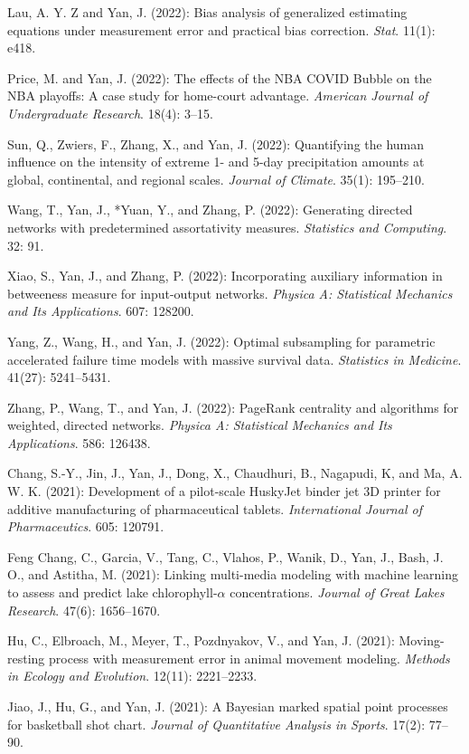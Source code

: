 \documentclass[Statistics]{vita}
\begin{document}
\begin{vita}
\begin{Publications}
\begin{RefereedJournalArticles}
  \item *Lau, A. Y. Z and Yan, J. (2022): Bias analysis of generalized estimating equations under measurement error and practical bias correction. {\em Stat\/}. 11(1): e418.
  \item *Price, M. and Yan, J. (2022): The effects of the NBA COVID Bubble on the NBA playoffs: A case study for home-court advantage. {\em American Journal of Undergraduate Research\/}. 18(4): 3--15.
  \item Sun, Q., Zwiers, F., Zhang, X., and Yan, J. (2022): Quantifying the human influence on the intensity of extreme 1- and 5-day precipitation amounts at global, continental, and regional scales. {\em Journal of Climate\/}. 35(1): 195--210.
  \item Wang, T., Yan, J., *Yuan, Y., and Zhang, P. (2022): Generating directed networks with predetermined assortativity measures. {\em Statistics and Computing}. 32: 91.
  \item *Xiao, S., Yan, J., and Zhang, P. (2022): Incorporating auxiliary information in betweeness measure for input-output networks. {\em Physica A: Statistical Mechanics and Its Applications\/}. 607: 128200.
  \item *Yang, Z., Wang, H., and Yan, J. (2022): Optimal subsampling for parametric accelerated failure time models with massive survival data. {\em Statistics in Medicine}. 41(27): 5241--5431.
  \item Zhang, P., Wang, T., and Yan, J. (2022): PageRank centrality and algorithms for weighted, directed networks. {\em Physica A: Statistical Mechanics and Its Applications\/}. 586: 126438.
  \item Chang, S.-Y., Jin, J., Yan, J., Dong, X., Chaudhuri, B., Nagapudi, K, and Ma, A. W. K. (2021): Development of a pilot-scale HuskyJet binder jet 3D printer for additive manufacturing of pharmaceutical tablets. {\em International Journal of Pharmaceutics\/}. 605: 120791.
  \item Feng Chang, C., Garcia, V., Tang, C., Vlahos, P., Wanik, D., Yan, J., Bash, J. O., and Astitha, M. (2021): Linking multi-media modeling with machine learning to assess and predict lake chlorophyll-$\alpha$ concentrations. {\em Journal of Great Lakes Research\/}. 47(6): 1656--1670.
  \item *Hu, C., Elbroach, M., Meyer, T., Pozdnyakov, V., and Yan, J. (2021): Moving-resting process with measurement error in animal movement modeling. {\em Methods in Ecology and Evolution\/}. 12(11): 2221--2233.
  \item *Jiao, J., Hu, G., and Yan, J. (2021): A Bayesian marked spatial point processes for basketball shot chart. {\em Journal of Quantitative Analysis in Sports\/}. 17(2): 77--90. 

\end{RefereedJournalArticles}
\end{Publications}
\end{vita}
\end{document}
